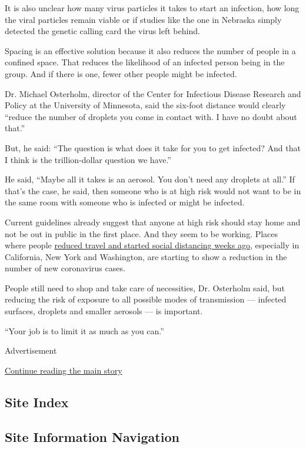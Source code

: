 It is also unclear how many virus particles it takes to start an
infection, how long the viral particles remain viable or if studies like
the one in Nebraska simply detected the genetic calling card the virus
left behind.

Spacing is an effective solution because it also reduces the number of
people in a confined space. That reduces the likelihood of an infected
person being in the group. And if there is one, fewer other people might
be infected.

Dr. Michael Osterholm, director of the Center for Infectious Disease
Research and Policy at the University of Minnesota, said the six-foot
distance would clearly ``reduce the number of droplets you come in
contact with. I have no doubt about that.''

But, he said: ``The question is what does it take for you to get
infected? And that I think is the trillion-dollar question we have.''

He said, ``Maybe all it takes is an aerosol. You don't need any droplets
at all.'' If that's the case, he said, then someone who is at high risk
would not want to be in the same room with someone who is infected or
might be infected.

Current guidelines already suggest that anyone at high risk should stay
home and not be out in public in the first place. And they seem to be
working. Places where people
\href{https://www.nytimes.com/interactive/2020/04/02/us/coronavirus-social-distancing.html}{reduced
travel and started social distancing weeks ago}, especially in
California, New York and Washington, are starting to show a reduction in
the number of new coronavirus cases.

People still need to shop and take care of necessities, Dr. Osterholm
said, but reducing the risk of exposure to all possible modes of
transmission --- infected surfaces, droplets and smaller aerosols --- is
important.

``Your job is to limit it as much as you can.''

Advertisement

\protect\hyperlink{after-bottom}{Continue reading the main story}

\hypertarget{site-index}{%
\subsection{Site Index}\label{site-index}}

\hypertarget{site-information-navigation}{%
\subsection{Site Information
Navigation}\label{site-information-navigation}}

